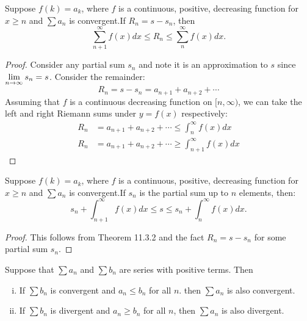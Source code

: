 \documentclass[a4paper,8pt]{article}
\begin{document}
\begin{outline}
    Suppose \(f(k) = a_k\), where \(f\) is a continuous, positive, decreasing function for \(x \geq n\) and \(\sum a_n\) is convergent.If
    \(R_n = s - s_n\), then \[ \sum_{n+1}^{\infty} f(x)dx \leq R_n \leq \sum_n^{\infty} f(x)dx\text{.} \]

    \begin{proof}
      Consider any partial sum \(s_n\) and note it is an approximation to \(s\) since \(\lim\limits_{n\rightarrow \infty^{}}s_n = s\). Consider the remainder:
      \[ R_n = s - s_n = a_{n+1} + a_{n+2} + \cdots \]
      Assuming that \(f\) is a continuous decreasing function on \([n, \infty)\), we can take the left and right Riemann sums under \(y = f(x)\)
      respectively:
      \begin{align*}
        R_n &= a_{n+1} + a_{n+2} + \cdots \leq \int_n^{\infty} f(x)dx \\
        R_n &= a_{n+1} + a_{n+2} + \cdots \geq \int_{n+1}^{\infty} f(x)dx
      \end{align*}
    \end{proof}

    Suppose \(f(k) = a_k\), where \(f\) is a continuous, positive, decreasing function for \(x \geq n\) and \(\sum a_n\) is convergent.If \(s_n\)
    is the partial sum up to \(n\) elements, then:
    \[ s_n + \int_{n+1}^{\infty} f(x)dx \leq s \leq s_n + \int_n^{\infty} f(x)dx\text{.} \]

    \begin{proof}
      This follows from Theorem 11.3.2 and the fact \(R_n = s - s_n\) for some partial sum \(s_n\).
    \end{proof}

    Suppose that \(\sum a_n\) and \(\sum b_n\) are series with positive terms. Then
    \begin{enumerate}[i.]
      \item If \(\sum b_n\) is convergent and \(a_n \leq b_n\) for all \(n\). then \(\sum a_n\) is also convergent.
      \item If \(\sum b_n\) is divergent and \(a_n \geq b_n\) for all \(n\), then \(\sum a_n\) is also divergent.
    \end{enumerate}


\end{outline}
\end{document}
